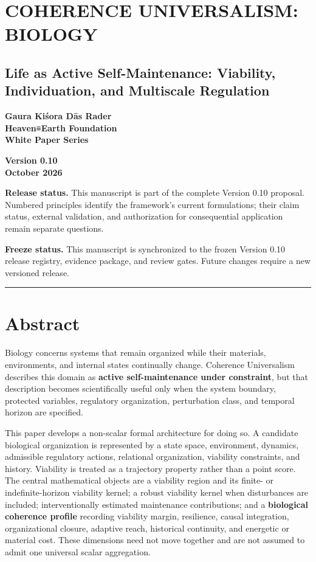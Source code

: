 \documentclass[
  11pt,
]{article}
\author{}
\date{}
\begin{document}
\section{COHERENCE UNIVERSALISM:
BIOLOGY}\label{coherence-universalism-biology}

\subsection{Life as Active Self-Maintenance: Viability, Individuation,
and Multiscale
Regulation}\label{life-as-active-self-maintenance-viability-individuation-and-multiscale-regulation}

\textbf{Gaura Kiśora Dās Rader}\\
\textbf{Heaven≡Earth Foundation}\\
\textbf{White Paper Series}

\textbf{Version 0.10}\\
\textbf{October 2026}

\textbf{Release status.} This manuscript is part of the complete Version
0.10 proposal. Numbered principles identify the framework's current
formulations; their claim status, external validation, and authorization
for consequential application remain separate questions.

\textbf{Freeze status.} This manuscript is synchronized to the frozen
Version 0.10 release registry, evidence package, and review gates.
Future changes require a new versioned release.

\begin{center}\rule{0.5\linewidth}{0.5pt}\end{center}

\section{Abstract}\label{abstract}

Biology concerns systems that remain organized while their materials,
environments, and internal states continually change. Coherence
Universalism describes this domain as \textbf{active self-maintenance
under constraint}, but that description becomes scientifically useful
only when the system boundary, protected variables, regulatory
organization, perturbation class, and temporal horizon are specified.

This paper develops a non-scalar formal architecture for doing so. A
candidate biological organization is represented by a state space,
environment, dynamics, admissible regulatory actions, relational
organization, viability constraints, and history. Viability is treated
as a trajectory property rather than a point score. The central
mathematical objects are a viability region and its finite- or
indefinite-horizon viability kernel; a robust viability kernel when
disturbances are included; interventionally estimated maintenance
contributions; and a \textbf{biological coherence profile} recording
viability margin, resilience, causal integration, organizational
closure, adaptive reach, historical continuity, and energetic or
material cost. These dimensions need not move together and are not
assumed to admit one universal scalar aggregation.
\end{document}
